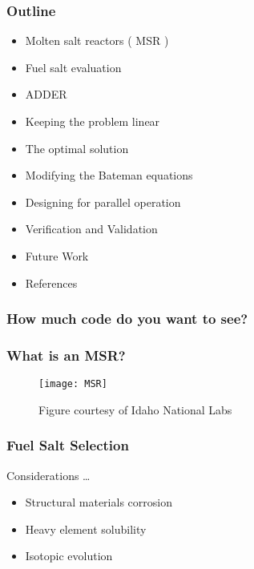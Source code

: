 \documentclass{beamer}
\title[Modelling of Material Transfers in MSRs]{}
\author{Daniel D. Wooten}
\institute{UC Berkeley}
\date{October 20\textsuperscript{th}, 2017}
\begin{document}
\frame{\titlepage}

\begin{frame}

\frametitle{Outline}

    \begin{itemize}
        \item Molten salt reactors ( MSR ) 
        \item Fuel salt evaluation 
        \item ADDER
        \item Keeping the problem linear
        \item The optimal solution
        \item Modifying the Bateman equations
        \item Designing for parallel operation
        \item Verification and Validation
        \item Future Work
        \item References
    \end{itemize}

\end{frame}

\begin{frame}
\frametitle{How much code do you want to see?}

\end{frame}

\begin{frame}
\frametitle{What is an MSR?}

    \begin{figure}
        \centering
        \texttt{[image: MSR]}
        \caption{Figure courtesy of Idaho National Labs}
        \label{fig:msr_pic}
    \end{figure}

\end{frame}

\begin{frame}
\frametitle{Fuel Salt Selection}

Considerations \ldots

    \begin{itemize}
        \item Structural materials corrosion 
        \item Heavy element solubility
        \item Isotopic evolution
    \end{itemize}

\end{frame}
\end{document}
